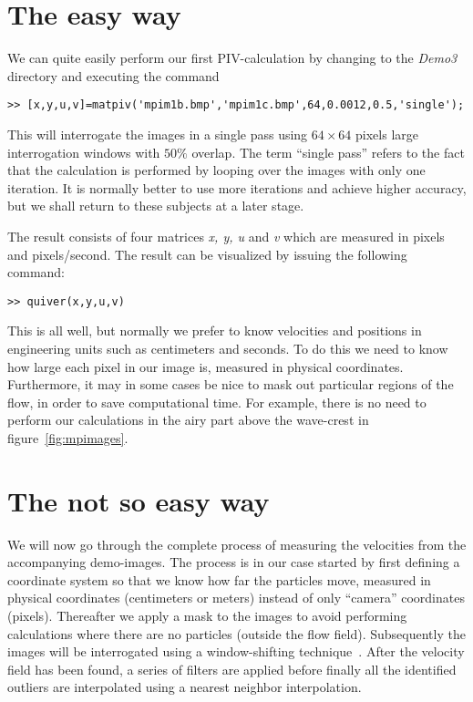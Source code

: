 \documentclass{book}
\begin{document}
\section{The easy way}
We can quite easily perform our first PIV-calculation by changing to the
{\em Demo3} directory and executing the command
\begin{verbatim}
>> [x,y,u,v]=matpiv('mpim1b.bmp','mpim1c.bmp',64,0.0012,0.5,'single');
\end{verbatim}
This will interrogate the images in a single pass using $64\times64$
pixels large interrogation windows with $50\%$ overlap. The term
``single pass'' refers to the fact that the calculation is performed by
looping over the images with only one iteration. It is normally better
to use more iterations and achieve higher accuracy, but we shall return
to these subjects at a later stage.

The result consists of four matrices {\em x, y, u} and {\em v} which
are measured in pixels and pixels/second. The result can be visualized
by issuing the following command:
\begin{verbatim}
>> quiver(x,y,u,v)
\end{verbatim}

This is all well, but normally we prefer to know velocities and
positions in engineering units such as centimeters and seconds. To do
this we need to know how large each pixel in our image is, measured in
physical coordinates. Furthermore, it may in some cases be nice to mask
out particular regions of the flow, in order to save computational time.
For example, there is no need to perform our calculations in the airy
part above the wave-crest in figure~\ref{fig:mpimages}.

\section{The not so easy way}
We will now go through the complete process of measuring the velocities
from the accompanying demo-images. The process is in our case started by
first defining a coordinate system so that we know how far the particles
move, measured in physical coordinates (centimeters or meters) instead
of only ``camera'' coordinates (pixels). Thereafter we apply a mask to
the images to avoid performing calculations where there are no particles
(outside the flow field). Subsequently the images will be interrogated
using a window-shifting technique~\cite[]{Westerweel:1997}. After the
velocity field has been found, a series of filters are applied before
finally all the identified outliers are interpolated using a nearest
neighbor interpolation.
\end{document}
